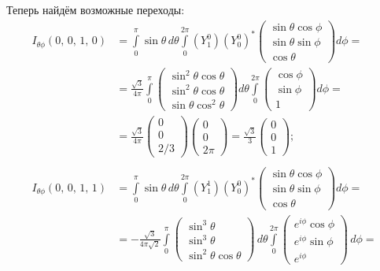 Теперь найдём возможные переходы:
\begin{align*}
  I_{\theta\phi}(0,\,0,\,1,\,0) &= \int\limits_{0}^{\pi}\sin\theta\,d\theta\int\limits_{0}^{2\pi}(Y^0_1)(Y^0_0)^*  \begin{pmatrix} \sin\theta\cos\phi \\ \sin\theta\sin\phi \\ \cos\theta \end{pmatrix} d\phi = \\ & = \frac{\sqrt{3}}{4\pi}\int\limits_{0}^{\pi} \begin{pmatrix} \sin^2\theta \cos\theta\\ \sin^2\theta \cos\theta \\ \sin\theta\cos^2\theta \end{pmatrix} d\theta \int\limits_{0}^{2\pi} \begin{pmatrix} \cos\phi \\ \sin\phi \\ 1 \end{pmatrix} d\phi = \\ & = \frac{\sqrt{3}}{4\pi}\begin{pmatrix} 0 \\  0 \\ 2/3 \end{pmatrix} \begin{pmatrix} 0 \\  0 \\ 2\pi \end{pmatrix} = \frac{\sqrt{3}}{3}\begin{pmatrix} 0 \\  0 \\ 1 \end{pmatrix}; \\
  \\
  I_{\theta\phi}(0,\,0,\,1,\,1) &= \int\limits_{0}^{\pi}\sin\theta\,d\theta\int\limits_{0}^{2\pi}(Y^1_1)(Y^0_0)^*  \begin{pmatrix} \sin\theta\cos\phi \\ \sin\theta\sin\phi \\ \cos\theta \end{pmatrix} d\phi = \\ & = -\frac{\sqrt{3}}{4\pi\sqrt{2}}\int\limits_{0}^{\pi} \begin{pmatrix} \sin^3 \theta \\ \sin^3 \theta \\ \sin^2\theta\cos\theta \end{pmatrix} \, d\theta \int\limits_{0}^{2\pi} \begin{pmatrix} e^{i\phi}\cos\phi \\ e^{i\phi}\sin\phi \\ e^{i\phi} \end{pmatrix} \, d\phi = \\

\end{align*}
